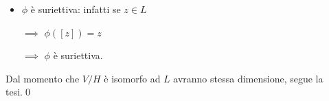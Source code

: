 {\begin{itemize}
        $\implies$ $ v=\sum_{i=1}^{h} x_{i}v_{i}    $ 
        
        $\implies$ $ v \in \mathscr{L}(v_1, \cdots, v_{n} ) $ 
        
        $\implies$ $ v \in H  $ $ \implies $ $ [v]=\underline{0}_{V/H} $ 
        
        $\implies$ $ \ker \phi =\{\underline{0}_{V/H}\} $ 
        
        $\implies$ $ \phi $ iniettiva.
        \item $ \phi $ è suriettiva: infatti se $ z \in L $ 
        
        $\implies$ $ \phi([z])=z $ 
        
        $\implies$ $ \phi $ è suriettiva.
    \end{itemize}

    Dal momento che $ V/H $ è isomorfo ad $ L $ avranno stessa dimensione, segue la tesi.\qed
}


